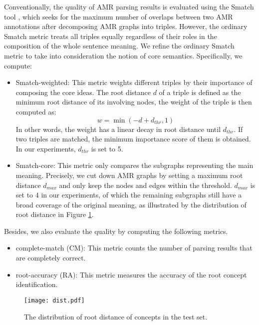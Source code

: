 \documentclass[11pt,a4paper]{article}
\begin{document}
	Conventionally, the quality of AMR parsing results is evaluated using the Smatch tool \cite{cai2013smatch}, which seeks for the maximum number of overlaps between two AMR annotations after decomposing AMR graphs into triples. However, the ordinary Smatch metric treats all triples equally regardless of their roles in the composition of the whole sentence meaning. We refine the ordinary Smatch metric to take into consideration the notion of core semantics. Specifically, we compute:
	\begin{itemize}
		\item Smatch-weighted: This metric weights different triples by their importance of composing the core ideas. The root distance $d$ of a triple is defined as the minimum root distance of its involving nodes, the weight of the triple is then computed as:
		\begin{equation}
		w = \min(-d + d_{thr}, 1)
		\nonumber
		\end{equation}
		In other words, the weight has a linear decay in root distance until $d_{thr}$. If two triples are matched, the minimum importance score of them is obtained. In our experiments, $d_{thr}$ is set to 5. 
		\item Smatch-core: This metric only compares the subgraphs representing the main meaning. Precisely, we cut down AMR graphs by setting a maximum root distance $d_{max}$ and only keep the nodes and edges within the threshold. $d_{max}$ is set to $4$ in our experiments, of which the remaining subgraphs still have a broad coverage of the original meaning, as illustrated by the distribution of root distance in Figure \ref{dist}.
	\end{itemize}
	Besides, we also evaluate the quality by computing the following metrics.
	\begin{itemize}
		\item complete-match (CM): This metric counts the number of parsing results that are completely correct.
		\item root-accuracy (RA): This metric measures the accuracy of the root concept identification.
	\end{itemize}
\begin{figure}[t]
	\centering
	\texttt{[image: dist.pdf]}
	\caption{The distribution of root distance of concepts in the test set.}
	\label{dist}
\end{figure} 
\end{document}
